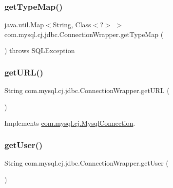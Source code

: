 \subsubsection{\texorpdfstring{get\+Type\+Map()}{getTypeMap()}}
{\footnotesize\ttfamily java.\+util.\+Map$<$String, Class$<$?$>$ $>$ com.\+mysql.\+cj.\+jdbc.\+Connection\+Wrapper.\+get\+Type\+Map (\begin{DoxyParamCaption}{ }\end{DoxyParamCaption}) throws S\+Q\+L\+Exception}

\mbox{\label{classcom_1_1mysql_1_1cj_1_1jdbc_1_1_connection_wrapper_a9e241644319ccf0cbba174d5ebe5208b}} 
\subsubsection{\texorpdfstring{get\+U\+R\+L()}{getURL()}}
{\footnotesize\ttfamily String com.\+mysql.\+cj.\+jdbc.\+Connection\+Wrapper.\+get\+U\+RL (\begin{DoxyParamCaption}{ }\end{DoxyParamCaption})}



Implements \mbox{\hyperlink{interfacecom_1_1mysql_1_1cj_1_1_mysql_connection_a8fab6ed57d7f54fbd017890355b610a2}{com.\+mysql.\+cj.\+Mysql\+Connection}}.

\mbox{\label{classcom_1_1mysql_1_1cj_1_1jdbc_1_1_connection_wrapper_ae9d26519d0e8ec724fb48ebc905f7684}} 
\subsubsection{\texorpdfstring{get\+User()}{getUser()}}
{\footnotesize\ttfamily String com.\+mysql.\+cj.\+jdbc.\+Connection\+Wrapper.\+get\+User (\begin{DoxyParamCaption}{ }\end{DoxyParamCaption})}



